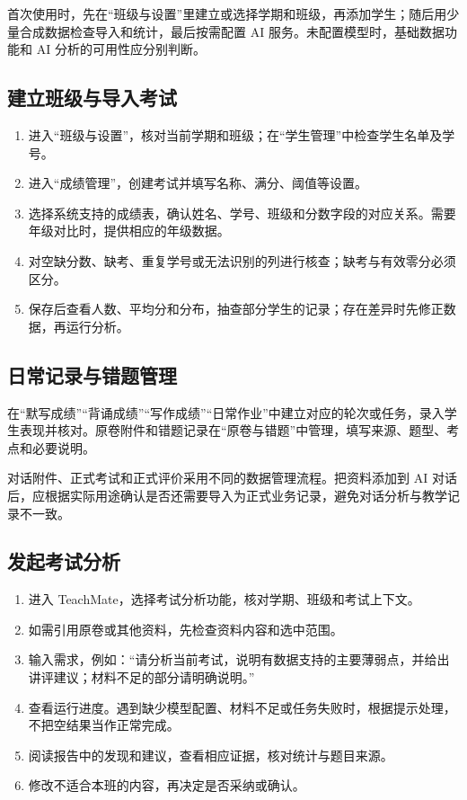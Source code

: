 \documentclass[11pt,a4paper,fontset=none]{ctexart}
\begin{document}
首次使用时，先在“班级与设置”里建立或选择学期和班级，再添加学生；随后用少量合成数据检查导入和统计，最后按需配置 AI 服务。未配置模型时，基础数据功能和 AI 分析的可用性应分别判断。

\subsection{建立班级与导入考试}

\begin{enumerate}
\item 进入“班级与设置”，核对当前学期和班级；在“学生管理”中检查学生名单及学号。
\item 进入“成绩管理”，创建考试并填写名称、满分、阈值等设置。
\item 选择系统支持的成绩表，确认姓名、学号、班级和分数字段的对应关系。需要年级对比时，提供相应的年级数据。
\item 对空缺分数、缺考、重复学号或无法识别的列进行核查；缺考与有效零分必须区分。
\item 保存后查看人数、平均分和分布，抽查部分学生的记录；存在差异时先修正数据，再运行分析。
\end{enumerate}

\subsection{日常记录与错题管理}

在“默写成绩”“背诵成绩”“写作成绩”“日常作业”中建立对应的轮次或任务，录入学生表现并核对。原卷附件和错题记录在“原卷与错题”中管理，填写来源、题型、考点和必要说明。

对话附件、正式考试和正式评价采用不同的数据管理流程。把资料添加到 AI 对话后，应根据实际用途确认是否还需要导入为正式业务记录，避免对话分析与教学记录不一致。

\subsection{发起考试分析}

\begin{enumerate}
\item 进入 TeachMate，选择考试分析功能，核对学期、班级和考试上下文。
\item 如需引用原卷或其他资料，先检查资料内容和选中范围。
\item 输入需求，例如：“请分析当前考试，说明有数据支持的主要薄弱点，并给出讲评建议；材料不足的部分请明确说明。”
\item 查看运行进度。遇到缺少模型配置、材料不足或任务失败时，根据提示处理，不把空结果当作正常完成。
\item 阅读报告中的发现和建议，查看相应证据，核对统计与题目来源。
\item 修改不适合本班的内容，再决定是否采纳或确认。
\end{enumerate}
\end{document}
